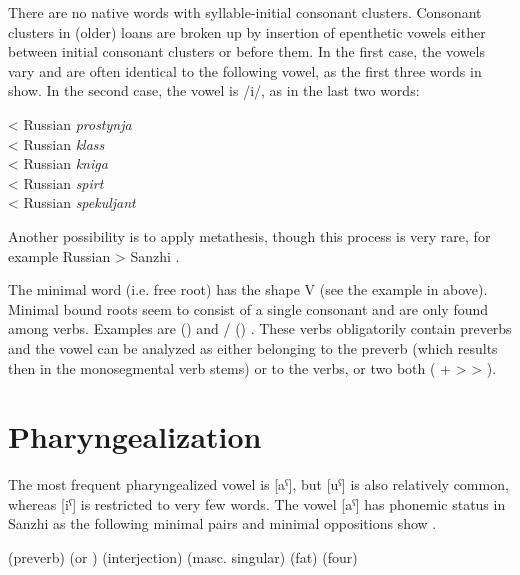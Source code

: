 There are no native words with syllable-initial consonant clusters. Consonant clusters in (older) loans are broken up by insertion of epenthetic vowels either between initial consonant clusters or before them. In the first case, the vowels vary and are often identical to the following vowel, as the first three words in  show. In the second case, the vowel is /i/, as in the last two words:
%
\begin{exe}
	\ex	\label{ex:epenthesis phon}
	\TabPositions{11em}
	 	\tab 	< Russian \textit{prostynja}	\\
		 	\tab 	< Russian \textit{klass}	\\
		 		\tab 	< Russian \textit{kniga}	\\
		 	\tab < Russian \textit{spirt} \\
				  \tab  < Russian \textit{spekuljant} 		
\end{exe}

Another possibility is to apply metathesis, though this process is very rare, for example Russian  > Sanzhi  .

The minimal word (i.e. free root) has the shape V (see the example in  above). Minimal bound roots seem to consist of a single consonant and are only found among verbs. Examples are  ()  and \slash{} () . These verbs obligatorily contain preverbs and the vowel can be analyzed as either belonging to the preverb (which results then in the monosegmental verb stems) or to the verbs, or two both ( +  >  > ).



\section{Pharyngealization}
\label{sec:Pharyngealization}

The most frequent pharyngealized vowel is [aˁ], but [uˁ] is also relatively common, whereas [iˁ] is restricted to very few words. The vowel [aˁ] has phonemic status in Sanzhi as the following minimal pairs and minimal oppositions show .
%
\begin{exe}
	\ex	\label{ex:pharyngealization minimal pairs A phon@A}
	\begin{xlist}
\TabPositions{13em}
		\ex	{}  \tab {} 
		\ex	{} (preverb)  \tab {} 
		\ex	{}  \tab {} 
		\ex	{} (or ) (interjection) \tab {}  (masc. singular)
		\ex	{}  (fat) \tab {}  (four)
		\ex	{}  \tab {} 
	\end{xlist}
\end{exe}

